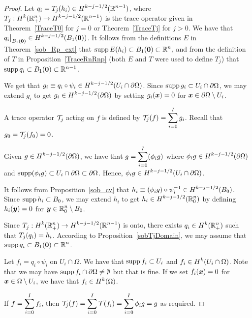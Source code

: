 \begin{proof}
Let $\displaystyle q_i = T_j(h_i) \in H^{k-j-1/2}(\mathbb{R}^{n-1})$,
where $\displaystyle T_j:H^k(\mathbb{R}^n_+) \to H^{k-j-1/2}(\mathbb{R}^{n-1})$ is
the trace operator given in Theorem~\ref{TraceT0} for $j=0$ or
Theorem~\ref{TraceTj} for $j>0$.  We have that
$\displaystyle q_i\big|_{B_1({\bm{0}})} \in H^{k-j-1/2}(B_1({\bm{0}}))$.
It follows from the definitions $E$ in Theorem~\ref{sob_Rp_ext}
that $\displaystyle \operatorname{supp} E(h_i) \subset B_1({\bm{0}}) \subset \mathbb{R}^n$,
and from the definition of $T$ in Proposition~\ref{TraceRnRnp} (both
$E$ and $T$ were used to define $T_j$)
that $\operatorname{supp} q_i \subset B_1({\bm{0}}) \subset \mathbb{R}^{n-1}$,

We get that
$\displaystyle g_i \equiv q_i \circ \psi_i \in
H^{k-j-1/2}(U_i \cap \partial \Omega)$.
Since $\operatorname{supp} g_i \subset U_i \cap \partial \Omega$, we
may extend $g_i$ to get
$\displaystyle g_i \in H^{k-j-1/2}(\partial \Omega)$ by setting
$g_i({\bm{x}}) = 0$ for ${\bm{x}} \in \partial \Omega \setminus U_i$.

A trace operator $\mathcal{T}_j$ acting on $f$ is defined by
$\displaystyle \mathcal{T}_j(f) = \sum_{i=0}^I g_i$.
Recall that $g_0 = \mathcal{T}_j(f_0) = 0$.

Given $\displaystyle g \in H^{k-j-1/2}(\partial \Omega)$, we have that
$\displaystyle g = \sum_{i=0}^I (\phi_i g)$ where
$\displaystyle \phi_i g \in H^{k-j-1/2}(\partial \Omega)$ and
$\operatorname{supp} (\phi_i g) \subset U_i \cap \partial \Omega \subset \partial \Omega$.
Hence,
$\displaystyle \phi_i g \in H^{k-j-1/2}(U_i \cap \partial \Omega)$.

It follows from Proposition~\ref{sob_cv} that
$\displaystyle h_i \equiv (\phi_i g) \circ \psi_i^{-1} \in H^{k-j-1/2}(B_0)$.
Since $\displaystyle \operatorname{supp} h_i \subset B_0$, we may extend
$h_i$ to get $h_i \in \displaystyle H^{k-j-1/2}(\mathbb{R}^n_0)$ by defining
$\displaystyle h_i({\bm{y}}) = 0$ for
$\displaystyle {\bm{y}} \in \mathbb{R}^n_0 \setminus B_0$.

Since $\displaystyle T_j: H^k(\mathbb{R}^n_+) \to H^{k-j-1/2}(\mathbb{R}^{n-1})$ is onto, there
exists $\displaystyle q_i \in H^k(\mathbb{R}^n_+)$ such that 
$\displaystyle T_j (q_i) = h_i$.  According to
Proposition~\ref{sobTjDomain}, we may assume that
$\displaystyle \operatorname{supp} q_i \subset B_1({\bm{0}}) \subset \mathbb{R}^n$.

Let $f_i = q_i \circ \psi_i$ on $U_i\cap \Omega$.  We have that
$\operatorname{supp} f_i \subset U_i$ and $\displaystyle f_i \in H^k(U_i\cap \Omega)$.
Note that we may have
$\operatorname{supp} f_i \cap \partial \Omega \neq \emptyset$ but that is fine.
If we set $f_i({\bm{x}}) = 0$ for
${\bm{x}} \in \Omega \setminus U_i$, we have that
$\displaystyle f_i \in H^k(\Omega)$.

If $\displaystyle f = \sum_{i=0}^I f_i$, then
$\displaystyle \mathcal{T}_j(f) = \sum_{i=0}^I \mathcal{T}(f_i) = \sum_{i=0}^I \phi_i g = g$ as
required.


\end{proof}
